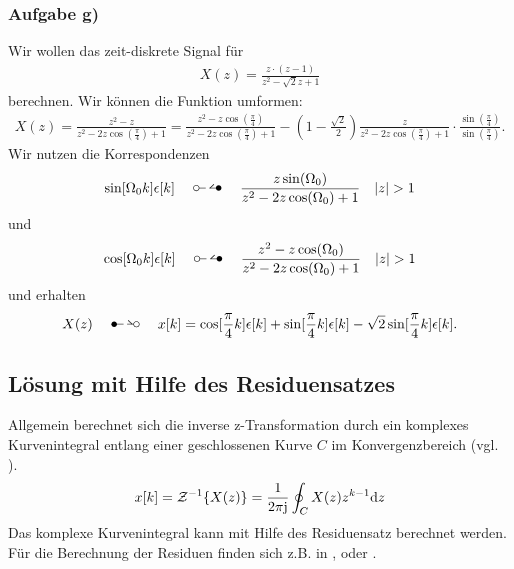 \documentclass[11pt,a4paper,DIV=12]{scrartcl}
\begin{document}
\subsubsection{Aufgabe g)}
\label{sec:taskg1}
Wir wollen das zeit-diskrete Signal für
\begin{align}
	X(z)=\frac{z\cdot(z-1)}{z^2-\sqrt{2}z+1}
\end{align}
berechnen.
Wir können die Funktion umformen:
\begin{align}
	X(z)=\frac{z^2-z}{z^2-2z\cos(\frac{\pi}{4})+1}=\frac{z^2-z\cos(\frac{\pi}{4})}{z^2-2z\cos(\frac{\pi}{4})+1}-(1-\frac{\sqrt{2}}{2})\frac{z}{z^2-2z\cos(\frac{\pi}{4})+1}\cdot\frac{\sin(\frac{\pi}{4})}{\sin(\frac{\pi}{4})}.
\end{align}
Wir nutzen die Korrespondenzen
\begin{align}
	\sin[\Omega_0k]\epsilon[k]\quad\ztransf\quad\frac{z\sin(\Omega_0)}{z^2-2z\cos(\Omega_0)+1}\quad |z| > 1
\end{align}
und
\begin{align}
	\cos[\Omega_0k]\epsilon[k]\quad\ztransf\quad\frac{z^2-z\cos(\Omega_0)}{z^2-2z\cos(\Omega_0)+1}\quad |z| > 1
\end{align}
und erhalten
\begin{align}
	X(z)\quad\Ztransf\quad x[k]=\cos[\frac{\pi}{4}k]\epsilon[k]+\sin[\frac{\pi}{4}k]\epsilon[k]-\sqrt{2}\sin[\frac{\pi}{4}k]\epsilon[k].
\end{align}
\newpage
\subsection{Lösung mit Hilfe des Residuensatzes}
Allgemein berechnet sich die inverse z-Transformation durch ein komplexes Kurvenintegral entlang einer geschlossenen Kurve $C$ im Konvergenzbereich (vgl. \cite[S. 192]{UlrichWeber2017} ).
\begin{align}
	x[k]=\mathcal{Z}^{-1}\{X(z)\}=\frac{1}{2\pi\im}\oint_C X(z)z^{k-1}\mathrm{d}z
\end{align}
Das komplexe Kurvenintegral kann mit Hilfe des Residuensatz berechnet werden.\\
Für die Berechnung der Residuen finden sich z.B. in \cite[K. 14, S. 753-754]{Bronstein2015}, \cite[S. 37-38]{UlrichWeber2017} oder \cite[S. 137-138]{Fritzsche2019}.
\end{document}
